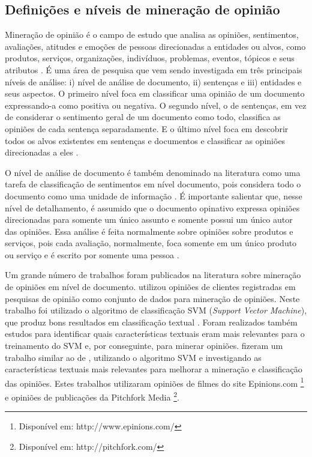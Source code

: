 \subsection{Definições e níveis de mineração de opinião}

Mineração de opinião é o campo de estudo que analisa as opiniões, sentimentos, avaliações, atitudes e emoções de pessoas direcionadas a entidades ou alvos, como produtos, serviços, organizações, indivíduos, problemas, eventos, tópicos e seus atributos \cite{bing:2012}. É uma área de pesquisa que vem sendo investigada em três principais níveis de análise: i) nível de análise de documento, ii) sentenças e iii) entidades e seus aspectos. O primeiro nível foca em classificar uma opinião de um documento expressando-a como positiva ou negativa. O segundo nível, o de sentenças, em vez de considerar o sentimento geral de um documento como todo, classifica as opiniões de cada sentença separadamente. E o último nível foca em descobrir todos os alvos existentes em sentenças e documentos e classificar as opiniões direcionadas a eles \cite{bing:2012}.

O nível de análise de documento é também denominado na literatura como uma tarefa de classificação de sentimentos em nível documento, pois considera todo o documento como uma unidade de informação \cite{bing:2012, pang:2008}. É importante salientar que, nesse nível de detalhamento, é assumido que o documento opinativo expressa opiniões direcionadas para somente um único assunto e somente possui um único autor das opiniões. Essa análise é feita normalmente sobre opiniões sobre produtos e serviços, pois cada avaliação, normalmente, foca somente em um único produto ou serviço e é escrito por somente uma pessoa \cite{bing:2012}.

Um grande número de trabalhos foram publicados na literatura sobre mineração de opiniões em nível de documento. \cite{gamon2004sentiment} utilizou opiniões de clientes registradas em pesquisas de opinião como conjunto de dados para mineração de opiniões. Neste trabalho foi utilizado o algoritmo de classificação SVM (\textit{Support Vector Machine}), que produz bons resultados em classificação textual \cite{joachims1998text}. Foram realizados também estudos para identificar quais características textuais eram mais relevantes para o treinamento do SVM e, por conseguinte, para minerar opiniões. \cite{mullen2004sentiment} fizeram um trabalho similar ao de \cite{gamon2004sentiment}, utilizando o algoritmo SVM e investigando as características textuais mais relevantes para melhorar a mineração e classificação das opiniões. Estes trabalhos utilizaram opiniões de filmes do site Epinions.com \footnote{Disponível em: http://www.epinions.com/} e opiniões de publicações da Pitchfork Media \footnote{Disponível em: http://pitchfork.com/}.


